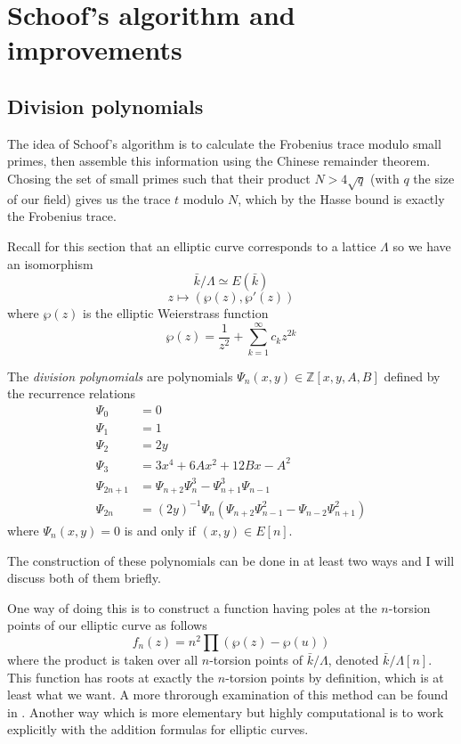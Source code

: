 \section{Schoof's algorithm and improvements}
\subsection{Division polynomials}
The idea of Schoof's algorithm is to calculate the Frobenius trace modulo small primes,
then assemble this information using the Chinese remainder theorem. Chosing the set
of small primes such that their product $N > 4 \sqrt q$ (with $q$ the size of our
field) gives us the trace $t$ modulo $N$, which by the Hasse bound is exactly
the Frobenius trace.

Recall for this section that an elliptic curve corresponds to a lattice $\Lambda$
so we have an isomorphism
$$ \bar{k}/\Lambda \simeq E(\bar{k}) $$
$$ z \mapsto (\wp(z), \wp '(z)) $$
where $\wp(z)$ is the elliptic Weierstrass function
$$\wp(z) = \frac{1}{z^2} + \sum_{k=1}^\infty c_k z^{2k} $$

\begin{mydef}
 The \emph{division polynomials} are polynomials $\Psi_n(x,y) \in \mathbb{Z}[x,y,A,B]$
defined by the recurrence relations
\begin{align*}
  \Psi_0 &= 0 \\
  \Psi_1 &= 1 \\
  \Psi_2 &= 2y \\
  \Psi_3 &= 3x^4 + 6Ax^2 + 12Bx - A^2 \\
  \Psi_{2n+1} &= \Psi_{n+2} \Psi_n^3 - \Psi_{n+1}^3 \Psi_{n-1} \\
  \Psi_{2n}   &= (2y)^{-1} \Psi_n(\Psi_{n+2} \Psi_{n-1}^2 - \Psi_{n-2} \Psi_{n+1}^2)
\end{align*}
where $\Psi_n(x,y) = 0$ is and only if $(x,y) \in E[n]$.
\end{mydef}
The construction of these polynomials can be done in at least two ways and I will discuss
both of them briefly.

One way of doing this is to construct
a function having poles at the $n$-torsion points of our elliptic curve as follows
$$ f_n(z) = n^2 \prod(\wp(z) - \wp(u)) $$
where the product is taken over all $n$-torsion points of $\bar{k}/\Lambda$, denoted
$\bar{k}/\Lambda[n]$. This function has roots at exactly the $n$-torsion points by definition,
which is at least what we want. A more throrough examination of this method can be found
in \cite{Serge}.
Another way which is more elementary but highly computational is to work explicitly
with the addition formulas for elliptic curves.

